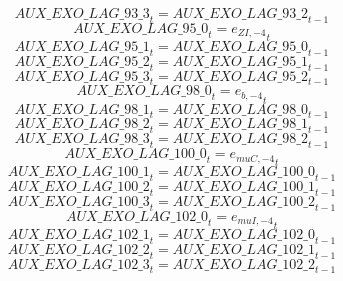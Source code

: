 \begin{dmath}
{AUX\_EXO\_LAG\_93\_3}_{t}={AUX\_EXO\_LAG\_93\_2}_{t-1}
\end{dmath}
\begin{dmath}
{AUX\_EXO\_LAG\_95\_0}_{t}={{e_{ZI,-4}}}_{t}
\end{dmath}
\begin{dmath}
{AUX\_EXO\_LAG\_95\_1}_{t}={AUX\_EXO\_LAG\_95\_0}_{t-1}
\end{dmath}
\begin{dmath}
{AUX\_EXO\_LAG\_95\_2}_{t}={AUX\_EXO\_LAG\_95\_1}_{t-1}
\end{dmath}
\begin{dmath}
{AUX\_EXO\_LAG\_95\_3}_{t}={AUX\_EXO\_LAG\_95\_2}_{t-1}
\end{dmath}
\begin{dmath}
{AUX\_EXO\_LAG\_98\_0}_{t}={{e_{b,-4}}}_{t}
\end{dmath}
\begin{dmath}
{AUX\_EXO\_LAG\_98\_1}_{t}={AUX\_EXO\_LAG\_98\_0}_{t-1}
\end{dmath}
\begin{dmath}
{AUX\_EXO\_LAG\_98\_2}_{t}={AUX\_EXO\_LAG\_98\_1}_{t-1}
\end{dmath}
\begin{dmath}
{AUX\_EXO\_LAG\_98\_3}_{t}={AUX\_EXO\_LAG\_98\_2}_{t-1}
\end{dmath}
\begin{dmath}
{AUX\_EXO\_LAG\_100\_0}_{t}={{e_{muC,-4}}}_{t}
\end{dmath}
\begin{dmath}
{AUX\_EXO\_LAG\_100\_1}_{t}={AUX\_EXO\_LAG\_100\_0}_{t-1}
\end{dmath}
\begin{dmath}
{AUX\_EXO\_LAG\_100\_2}_{t}={AUX\_EXO\_LAG\_100\_1}_{t-1}
\end{dmath}
\begin{dmath}
{AUX\_EXO\_LAG\_100\_3}_{t}={AUX\_EXO\_LAG\_100\_2}_{t-1}
\end{dmath}
\begin{dmath}
{AUX\_EXO\_LAG\_102\_0}_{t}={{e_{muI,-4}}}_{t}
\end{dmath}
\begin{dmath}
{AUX\_EXO\_LAG\_102\_1}_{t}={AUX\_EXO\_LAG\_102\_0}_{t-1}
\end{dmath}
\begin{dmath}
{AUX\_EXO\_LAG\_102\_2}_{t}={AUX\_EXO\_LAG\_102\_1}_{t-1}
\end{dmath}
\begin{dmath}
{AUX\_EXO\_LAG\_102\_3}_{t}={AUX\_EXO\_LAG\_102\_2}_{t-1}
\end{dmath}
